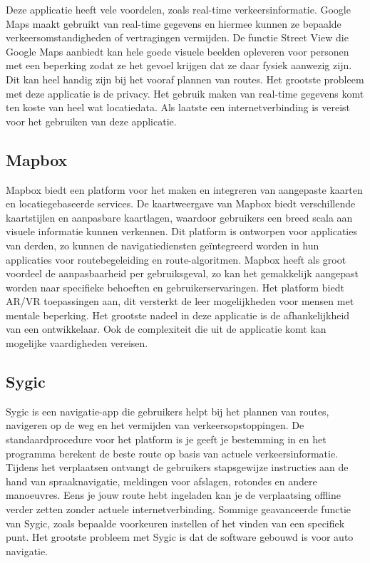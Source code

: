 Deze applicatie heeft vele voordelen, zoals real-time verkeersinformatie. Google Maps maakt gebruikt van real-time gegevens en hiermee kunnen ze bepaalde verkeersomstandigheden of vertragingen vermijden. De functie Street View die Google Maps aanbiedt kan hele goede visuele beelden opleveren voor personen met een beperking zodat ze het gevoel krijgen dat ze daar fysiek aanwezig zijn. Dit kan heel handig zijn bij het vooraf plannen van routes. Het grootste probleem met deze applicatie is de privacy. Het gebruik maken van real-time gegevens komt ten koste van heel wat locatiedata. Als laatste een internetverbinding is vereist voor het gebruiken van deze applicatie.

\subsection{Mapbox}
\label{sec:mapbox}

Mapbox biedt een platform voor het maken en integreren van aangepaste kaarten en locatiegebaseerde services. De kaartweergave van Mapbox biedt verschillende kaartstijlen en aanpasbare kaartlagen, waardoor gebruikers een breed scala aan visuele informatie kunnen verkennen. Dit platform is ontworpen voor applicaties van derden, zo kunnen de navigatiediensten geïntegreerd worden in hun applicaties voor routebegeleiding en route-algoritmen. Mapbox heeft als groot voordeel de aanpasbaarheid per gebruiksgeval, zo kan het gemakkelijk aangepast worden naar specifieke behoeften en gebruikerservaringen. Het platform biedt AR/VR toepassingen aan, dit versterkt de leer mogelijkheden voor mensen met mentale beperking. Het grootste nadeel in deze applicatie is de afhankelijkheid van een ontwikkelaar. Ook de complexiteit die uit de applicatie komt kan mogelijke vaardigheden vereisen.

\subsection{Sygic}
\label{sec:sygic}

Sygic is een navigatie-app die gebruikers helpt bij het plannen van routes, navigeren op de weg en het vermijden van verkeersopstoppingen. De standaardprocedure voor het platform is je geeft je bestemming in en het programma berekent de beste route op basis van actuele verkeersinformatie. Tijdens het verplaatsen ontvangt de gebruikers stapsgewijze instructies aan de hand van spraaknavigatie, meldingen voor afslagen, rotondes en andere manoeuvres. Eens je jouw route hebt ingeladen kan je de verplaatsing offline verder zetten zonder actuele internetverbinding. Sommige geavanceerde functie van Sygic, zoals bepaalde voorkeuren instellen of het vinden van een specifiek punt. Het grootste probleem met Sygic is dat de software gebouwd is voor auto navigatie.

